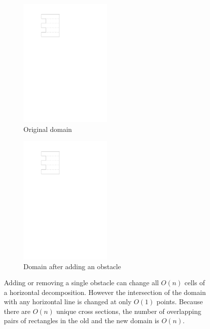 \documentclass[english,gradu]{tktltiki2018}
\begin{document}
\begin{figure}\centering
	\begin{subfigure}[t]{0.45\textwidth}\centering
		\includegraphics[width=0.5\textwidth,page=1]{fig/linkproof}
		\caption{Original domain}
	\end{subfigure}
	\hfil
	\begin{subfigure}[t]{0.45\textwidth}\centering
		\includegraphics[width=0.5\textwidth,page=2]{fig/linkproof}
		\caption{Domain after adding an obstacle}
	\end{subfigure}
	\caption{Adding or removing a single obstacle can change all $O(n)$ cells of a horizontal decomposition.
	However the intersection of the domain with any horizontal line is changed at only $O(1)$ points.
	Because there are $O(n)$ unique cross sections, the number of overlapping pairs of rectangles in the old and the new domain is $O(n)$.}\label{fig:linkproof}
\end{figure}
\end{document}
